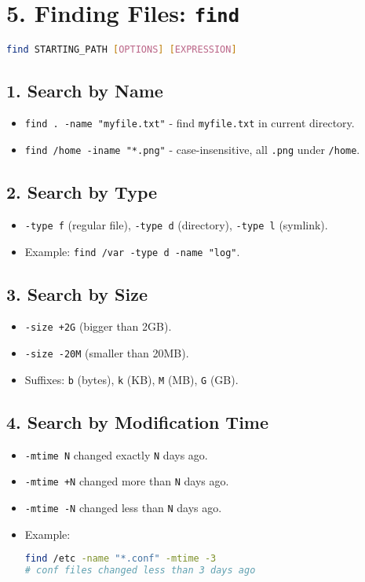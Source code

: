 \documentclass[a4paper]{report}
\begin{document}
\section*{5. Finding Files: \texttt{find}}
\begin{lstlisting}[language=bash]
find STARTING_PATH [OPTIONS] [EXPRESSION]
\end{lstlisting}

\subsection*{1. Search by Name}
\begin{itemize}
    \item \texttt{find . -name "myfile.txt"} \text{-}- find \texttt{myfile.txt} in current directory.
    \item \texttt{find /home -iname "*.png"} \text{-}- case-insensitive, all \texttt{.png} under \texttt{/home}.
\end{itemize}

\subsection*{2. Search by Type}
\begin{itemize}
    \item \texttt{-type f} (regular file), \texttt{-type d} (directory), \texttt{-type l} (symlink).
    \item Example: \texttt{find /var -type d -name "log"}.
\end{itemize}

\subsection*{3. Search by Size}
\begin{itemize}
    \item \texttt{-size +2G} (bigger than 2GB).
    \item \texttt{-size -20M} (smaller than 20MB).
    \item Suffixes: \texttt{b} (bytes), \texttt{k} (KB), \texttt{M} (MB), \texttt{G} (GB).
\end{itemize}

\subsection*{4. Search by Modification Time}
\begin{itemize}
    \item \texttt{-mtime N} \textrightarrow changed exactly \texttt{N} days ago.
    \item \texttt{-mtime +N} \textrightarrow changed more than \texttt{N} days ago.
    \item \texttt{-mtime -N} \textrightarrow changed less than \texttt{N} days ago.
    \item Example:
        \begin{lstlisting}[language=bash]
find /etc -name "*.conf" -mtime -3
# conf files changed less than 3 days ago
        \end{lstlisting}
\end{itemize}
\end{document}
